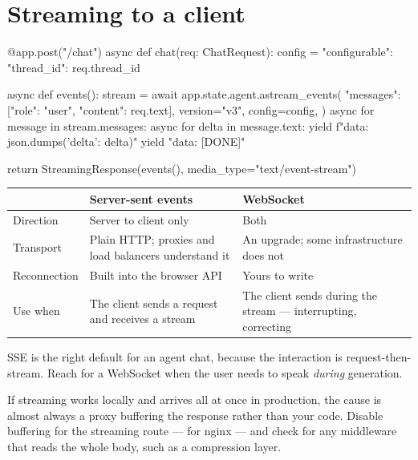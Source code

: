 \section{Streaming to a client}
\label{sec:sse}

\begin{python}[caption={The chat endpoint}, label={lst:sse}]
@app.post("/chat")
async def chat(req: ChatRequest):
    config = {"configurable": {"thread_id": req.thread_id}}

    async def events():
        stream = await app.state.agent.astream_events(
            {"messages": [{"role": "user", "content": req.text}]},
            version="v3", config=config,
        )
        async for message in stream.messages:
            async for delta in message.text:
                yield f"data: {json.dumps({'delta': delta})}\n\n"
        yield "data: [DONE]\n\n"

    return StreamingResponse(events(), media_type="text/event-stream")
\end{python}

\begin{center}
\small
\begin{tabularx}{\linewidth}{@{}lXX@{}}
\toprule
 & \textbf{Server-sent events} & \textbf{WebSocket} \\
\midrule
Direction & Server to client only & Both \\
Transport & Plain HTTP; proxies and load balancers understand it & An upgrade;
  some infrastructure does not \\
Reconnection & Built into the browser API & Yours to write \\
Use when & The client sends a request and receives a stream & The client sends
  during the stream --- interrupting, correcting \\
\bottomrule
\end{tabularx}
\end{center}

SSE is the right default for an agent chat, because the interaction is
request-then-stream. Reach for a WebSocket when the user needs to speak
\emph{during} generation.

\begin{warning}
If streaming works locally and arrives all at once in production, the cause is
almost always a proxy buffering the response rather than your code. Disable
buffering for the streaming route ---  for nginx ---
and check for any middleware that reads the whole body, such as a compression
layer.
\end{warning}


